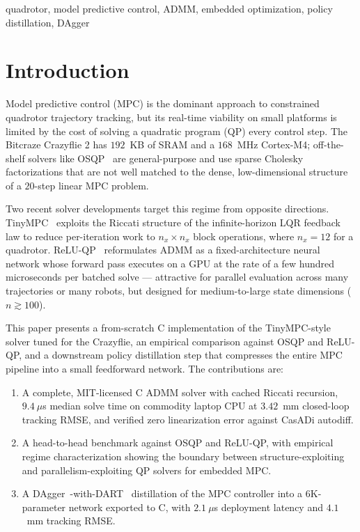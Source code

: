\documentclass[conference]{IEEEtran}
\begin{document}
\begin{IEEEkeywords}
quadrotor, model predictive control, ADMM, embedded optimization, policy distillation, DAgger
\end{IEEEkeywords}

\section{Introduction}

Model predictive control (MPC) is the dominant approach to constrained quadrotor trajectory tracking, but its real-time viability on small platforms is limited by the cost of solving a quadratic program (QP) every control step. The Bitcraze Crazyflie 2 has $192$~KB of SRAM and a $168$~MHz Cortex-M4; off-the-shelf solvers like OSQP~\cite{stellato2020osqp} are general-purpose and use sparse Cholesky factorizations that are not well matched to the dense, low-dimensional structure of a $20$-step linear MPC problem.

Two recent solver developments target this regime from opposite directions. TinyMPC~\cite{nguyen2024tinympc} exploits the Riccati structure of the infinite-horizon LQR feedback law to reduce per-iteration work to $n_x \times n_x$ block operations, where $n_x = 12$ for a quadrotor. ReLU-QP~\cite{bishop2024reluqp} reformulates ADMM as a fixed-architecture neural network whose forward pass executes on a GPU at the rate of a few hundred microseconds per batched solve --- attractive for parallel evaluation across many trajectories or many robots, but designed for medium-to-large state dimensions ($n \gtrsim 100$).

This paper presents a from-scratch C implementation of the TinyMPC-style solver tuned for the Crazyflie, an empirical comparison against OSQP and ReLU-QP, and a downstream policy distillation step that compresses the entire MPC pipeline into a small feedforward network. The contributions are:

\begin{enumerate}
    \item A complete, MIT-licensed C ADMM solver with cached Riccati recursion, $9.4~\mu$s median solve time on commodity laptop CPU at $3.42$~mm closed-loop tracking RMSE, and verified zero linearization error against CasADi autodiff.
    \item A head-to-head benchmark against OSQP and ReLU-QP, with empirical regime characterization showing the boundary between structure-exploiting and parallelism-exploiting QP solvers for embedded MPC.
    \item A DAgger~\cite{ross2011dagger}-with-DART~\cite{laskey2017dart} distillation of the MPC controller into a $6$K-parameter network exported to C, with $2.1~\mu$s deployment latency and $4.1$~mm tracking RMSE.
\end{enumerate}
\end{document}
